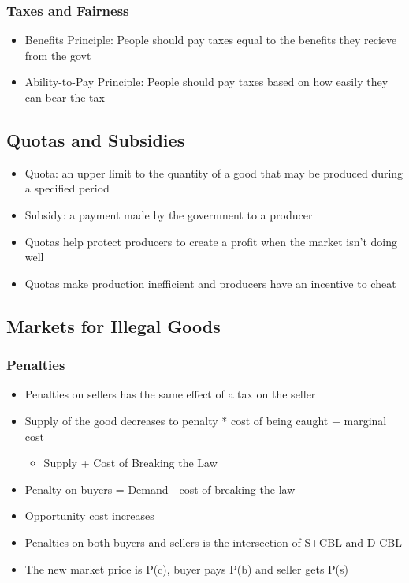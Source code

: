 \documentclass[11pt]{article}
\begin{document}
\subsubsection{Taxes and Fairness}
\label{sec:org0d8eebb}
\begin{itemize}
\item Benefits Principle: People should pay taxes equal to the benefits they recieve from the govt
\item Ability-to-Pay Principle: People should pay taxes based on how easily they can bear the tax
\end{itemize}
\subsection{Quotas and Subsidies}
\label{sec:org8e4e045}
\begin{itemize}
\item Quota: an upper limit to the quantity of a good that may be produced during a specified period
\item Subsidy: a payment made by the government to a producer
\item Quotas help protect producers to create a profit when the market isn't doing well
\item Quotas make production inefficient and producers have an incentive to cheat
\end{itemize}
\subsection{Markets for Illegal Goods}
\label{sec:org67ddfd4}
\subsubsection{Penalties}
\label{sec:org733b8ed}
\begin{itemize}
\item Penalties on sellers has the same effect of a tax on the seller
\item Supply of the good decreases to penalty * cost of being caught + marginal cost 
\begin{itemize}
\item Supply + Cost of Breaking the Law
\end{itemize}
\item Penalty on buyers = Demand - cost of breaking the law
\item Opportunity cost increases
\item Penalties on both buyers and sellers is the intersection of S+CBL and D-CBL
\item The new market price is P(c), buyer pays P(b) and seller gets P(s)
\end{itemize}
\end{document}
